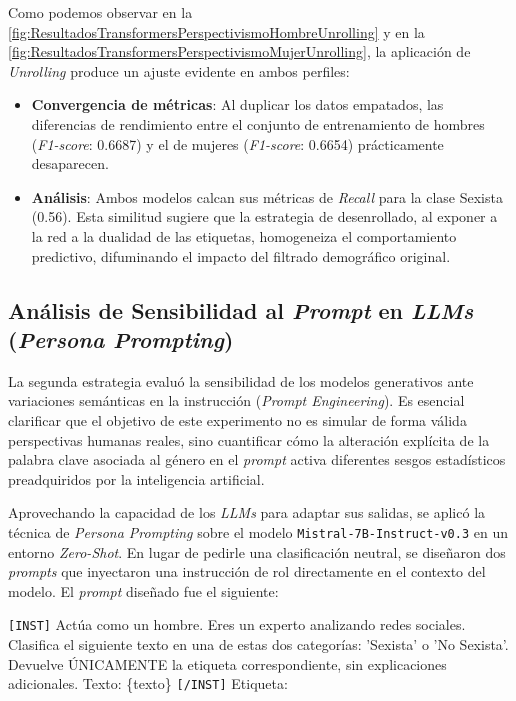 Como podemos observar en la \autoref{fig:ResultadosTransformersPerspectivismoHombreUnrolling} y en la \autoref{fig:ResultadosTransformersPerspectivismoMujerUnrolling}, la aplicación de \textit{Unrolling} produce un ajuste evidente en ambos perfiles: 
\begin{itemize}
    \item \textbf{Convergencia de métricas}: Al duplicar los datos empatados, las diferencias de rendimiento entre el conjunto de entrenamiento de hombres (\textit{F1-score}: 0.6687) y el de mujeres (\textit{F1-score}: 0.6654) prácticamente desaparecen.
    \item \textbf{Análisis}: Ambos modelos calcan sus métricas de \textit{Recall} para la clase Sexista (0.56). Esta similitud sugiere que la estrategia de desenrollado, al exponer a la red a la dualidad de las etiquetas, homogeneiza el comportamiento predictivo, difuminando el impacto del filtrado demográfico original.
\end{itemize}

\subsection{Análisis de Sensibilidad al \textit{Prompt} en \textit{LLMs} (\textit{Persona Prompting})}
\label{subsec:InyeccionDeRolesEnLLMs}
La segunda estrategia evaluó la sensibilidad de los modelos generativos ante variaciones semánticas en la instrucción (\textit{Prompt Engineering}). Es esencial clarificar que el objetivo de este experimento no es simular de forma válida perspectivas humanas reales, sino cuantificar cómo la alteración explícita de la palabra clave asociada al género en el \textit{prompt} activa diferentes sesgos estadísticos preadquiridos por la inteligencia artificial.

Aprovechando la capacidad de los \textit{LLMs} para adaptar sus salidas, se aplicó la técnica de \textit{Persona Prompting} sobre el modelo \texttt{Mistral-7B-Instruct-v0.3} en un entorno \textit{Zero-Shot}. En lugar de pedirle una clasificación neutral, se diseñaron dos \textit{prompts} que inyectaron una instrucción de rol directamente en el contexto del modelo. El \textit{prompt} diseñado fue el siguiente:

\begin{tcolorbox}[colback=gray!10, colframe=gray!40, arc=4pt, boxrule=0.5pt]
    \texttt{[INST]} Actúa como un hombre. Eres un experto analizando redes sociales. Clasifica el siguiente texto en una de estas dos categorías: 'Sexista' o 'No Sexista'. Devuelve ÚNICAMENTE la etiqueta correspondiente, sin explicaciones adicionales. Texto: \{texto\} \texttt{[/INST]} 
    Etiqueta:
\end{tcolorbox}


